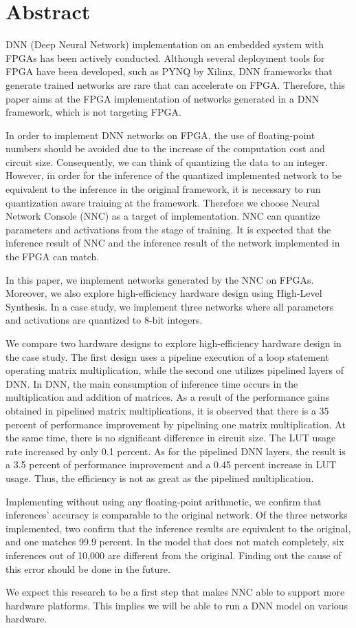 
\chapter*{Abstract}
  DNN (Deep Neural Network) implementation on an embedded system with FPGAs has been actively conducted.
Although several deployment tools for FPGA have been developed, such as PYNQ by Xilinx, DNN frameworks that generate trained networks are rare that can accelerate on FPGA.
Therefore, this paper aims at the FPGA implementation of networks generated in a DNN framework, which is not targeting FPGA.

In order to implement DNN networks on FPGA, the use of floating-point numbers should be avoided due to the increase of the computation cost and circuit size. Consequently, we can think of quantizing the data to an integer. However, in order for the inference of the quantized implemented network to be equivalent to the inference in the original framework, it is necessary to run quantization aware training at the framework. Therefore we choose Neural Network Console (NNC) as a target of implementation. NNC can quantize parameters and activations from the stage of training. It is expected that the inference result of NNC and the inference result of the network implemented in the FPGA can match.

In this paper, we implement networks generated by the NNC on FPGAs. Moreover, we also explore high-efficiency hardware design using High-Level Synthesis. In a case study, we implement three networks where all parameters and activations are quantized to 8-bit integers.


We compare two hardware designs to explore high-efficiency hardware design in the case study. The first design uses a pipeline execution of a loop statement operating matrix multiplication, while the second one utilizes pipelined layers of DNN. In DNN, the main consumption of inference time occurs in the multiplication and addition of matrices. As a result of the performance gains obtained in pipelined matrix multiplications, it is observed that there is a 35 percent of performance improvement by pipelining one matrix multiplication. At the same time, there is no significant difference in circuit size. The LUT usage rate increased by only 0.1 percent. As for the pipelined DNN layers, the result is a 3.5 percent of performance improvement and a 0.45 percent increase in LUT usage. Thus, the efficiency is not as great as the pipelined multiplication.

Implementing without using any floating-point arithmetic, we confirm that inferences' accuracy is comparable to the original network. Of the three networks implemented, two confirm that the inference results are equivalent to the original, and one matches 99.9 percent. In the model that does not match completely, six inferences out of 10,000 are different from the original. Finding out the cause of this error should be done in the future.

We expect this research to be a first step that makes NNC able to support more hardware platforms.  This implies we will be able to run a DNN model on various hardware.
